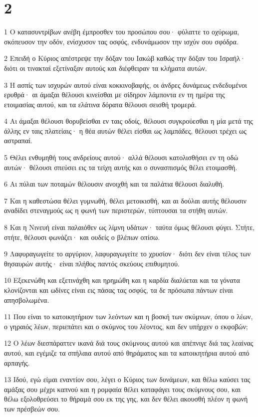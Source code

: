 \chapter{2}

\par 1 Ο κατασυντρίβων ανέβη έμπροσθεν του προσώπου σου· φύλαττε το οχύρωμα, σκόπευσον την οδόν, ενίσχυσον τας οσφύς, ενδυνάμωσον την ισχύν σου σφόδρα.
\par 2 Επειδή ο Κύριος απέστρεψε την δόξαν του Ιακώβ καθώς την δόξαν του Ισραήλ· διότι οι τινακταί εξετίναξαν αυτούς και διέφθειραν τα κλήματα αυτών.
\par 3 Η ασπίς των ισχυρών αυτού είναι κοκκινοβαφής, οι άνδρες δυνάμεως ενδεδυμένοι ερυθρά· αι άμαξαι θέλουσι κινείσθαι με σίδηρον λάμποντα εν τη ημέρα της ετοιμασίας αυτού, και τα ελάτινα δόρατα θέλουσι σεισθή τρομερά.
\par 4 Αι άμαξαι θέλουσι θορυβείσθαι εν ταις οδοίς, θέλουσι συγκρούεσθαι η μία μετά της άλλης εν ταις πλατείαις· η θέα αυτών θέλει είσθαι ως λαμπάδες, θέλουσι τρέχει ως αστραπαί.
\par 5 Θέλει ενθυμηθή τους ανδρείους αυτού· αλλά θέλουσι κατολισθήσει εν τη οδώ αυτών· θέλουσι σπεύσει εις τα τείχη αυτής και ο συνασπισμός θέλει ετοιμασθή.
\par 6 Αι πύλαι των ποταμών θέλουσιν ανοιχθή και τα παλάτια θέλουσι διαλυθή.
\par 7 Και η καθεστώσα θέλει γυμνωθή, θέλει μετοικισθή, και αι δούλαι αυτής θέλουσιν αναδίδει στεναγμούς ως η φωνή των περιστερών, τύπτουσαι τα στήθη αυτών.
\par 8 Και η Νινευή είναι παλαιόθεν ως λίμνη υδάτων· ταύτα όμως θέλουσι φύγει. Στήτε, στήτε, θέλουσι φωνάζει· και ουδείς ο βλέπων οπίσω.
\par 9 Λαφυραγωγείτε το αργύριον, λαφυραγωγείτε το χρυσίον· διότι δεν είναι τέλος των θησαυρών αυτής· είναι πλήθος παντός σκεύους επιθυμητού.
\par 10 Εξεκενώθη και εξετινάχθη και ηρημώθη και η καρδία διαλύεται και τα γόνατα κλονίζονται και ωδίνες είναι εις πάσας τας οσφύς, τα δε πρόσωπα πάντων είναι απησβολωμένα.
\par 11 Που είναι το κατοικητήριον των λεόντων και η βοσκή των σκύμνων, όπου ο λέων, ο γηραιός λέων, περιεπάτει και ο σκύμνος του λέοντος, και δεν υπήρχεν ο εκφοβών;
\par 12 Ο λέων διεσπάραττεν ικανά διά τους σκύμνους αυτού και απέπνιγε διά τας λεαίνας αυτού, και εγέμιζε τα σπήλαια αυτού από θηράματος και τα κατοικητήρια αυτού από αρπαγής.
\par 13 Ιδού, εγώ είμαι εναντίον σου, λέγει ο Κύριος των δυνάμεων, και θέλω καύσει τας αμάξας σου μέχρι καπνού και η ρομφαία θέλει καταφάγει τους σκύμνους σου, και θέλω εξολοθρεύσει το θήραμά σου εκ της γης, και δεν θέλει ακουσθή πλέον η φωνή των πρέσβεών σου.

